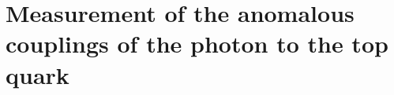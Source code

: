 \chapter{Measurement of the anomalous couplings of the photon to the top quark}\label{chap-anomolouscouplings}

\cite{QCDCorrectionsttgamma2011} \cite{OneLoopQCDCorrection}